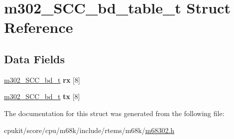 \hypertarget{structm302__SCC__bd__table__t}{}\section{m302\+\_\+\+S\+C\+C\+\_\+bd\+\_\+table\+\_\+t Struct Reference}
\label{structm302__SCC__bd__table__t}
\subsection*{Data Fields}
\begin{DoxyCompactItemize}
\item 
\mbox{\label{structm302__SCC__bd__table__t_a82161f4a7704eaffa25cb4007c4de750}} 
\mbox{\hyperlink{structm302__SCC__bd}{m302\+\_\+\+S\+C\+C\+\_\+bd\+\_\+t}} {\bfseries rx} \mbox{[}8\mbox{]}
\item 
\mbox{\label{structm302__SCC__bd__table__t_a734b574541c2dc5317502dee404fad8e}} 
\mbox{\hyperlink{structm302__SCC__bd}{m302\+\_\+\+S\+C\+C\+\_\+bd\+\_\+t}} {\bfseries tx} \mbox{[}8\mbox{]}
\end{DoxyCompactItemize}


The documentation for this struct was generated from the following file\+:\begin{DoxyCompactItemize}
\item 
cpukit/score/cpu/m68k/include/rtems/m68k/\mbox{\hyperlink{m68302_8h}{m68302.\+h}}\end{DoxyCompactItemize}
